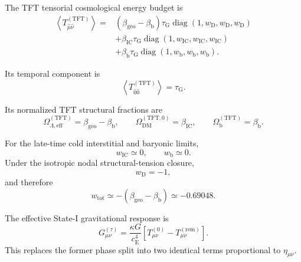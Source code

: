 The TFT tensorial cosmological energy budget is
\begin{equation}
\begin{aligned}
    \left\langle T_{\hat{\mu}\hat{\nu}}^{(\mathrm{TFT})} \right\rangle ={}& \left( \beta_{\mathrm{geo}} - \beta_{\mathrm{b}} \right) \tau_{\mathrm{G}} \operatorname{diag} \left( 1,w_{\mathrm{D}},w_{\mathrm{D}},w_{\mathrm{D}} \right) \\
    &+ \beta_{\mathrm{IC}} \tau_{\mathrm{G}} \operatorname{diag} \left( 1,w_{\mathrm{IC}},w_{\mathrm{IC}},w_{\mathrm{IC}} \right) \\
    &+ \beta_{\mathrm{b}} \tau_{\mathrm{G}} \operatorname{diag} \left( 1,w_{\mathrm{b}},w_{\mathrm{b}},w_{\mathrm{b}} \right).
\end{aligned}
\end{equation}

Its temporal component is
\begin{equation}
    \left\langle T_{\hat{0}\hat{0}}^{(\mathrm{TFT})} \right\rangle = \tau_{\mathrm{G}}.
\end{equation}

Its normalized TFT structural fractions are
\begin{equation}
    \Omega_{\Lambda,\mathrm{eff}}^{(\mathrm{TFT})} = \beta_{\mathrm{geo}}-\beta_{\mathrm{b}}, \qquad \Omega_{\mathrm{DM}}^{(\mathrm{TFT},0)} = \beta_{\mathrm{IC}}, \qquad \Omega_{\mathrm{b}}^{(\mathrm{TFT})} = \beta_{\mathrm{b}}.
\end{equation}

For the late-time cold interstitial and baryonic limits,
\begin{equation}
    w_{\mathrm{IC}}\simeq0, \qquad w_{\mathrm{b}}\simeq0.
\end{equation}
Under the isotropic nodal structural-tension closure,
\begin{equation}
    w_{\mathrm{D}}=-1,
\end{equation}
and therefore
\begin{equation}
    w_{\mathrm{tot}} \simeq -\left( \beta_{\mathrm{geo}} - \beta_{\mathrm{b}} \right) \simeq-0.69048.
\end{equation}

The effective State-I gravitational response is
\begin{equation}
    G_{\mu\nu}^{(\tau)} = \frac{\kappa G}{c_{\mathrm{E}}^4} \left[ T_{\mu\nu}^{(0)} - T_{\mu\nu}^{(\mathrm{rem})} \right].
\end{equation}
This replaces the former phase split into two identical terms proportional to $\eta_{\mu\nu}$.

